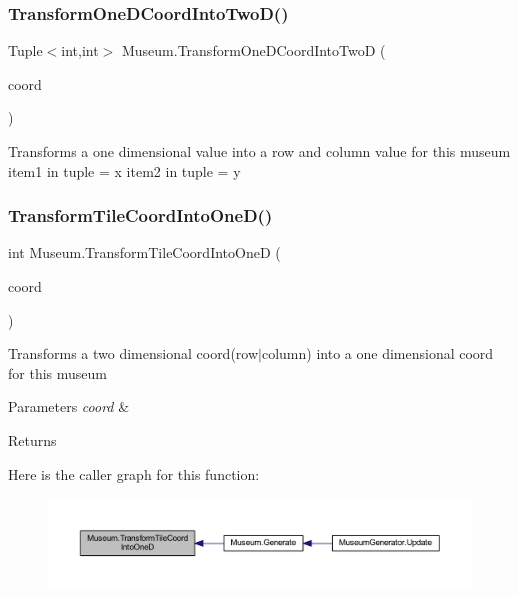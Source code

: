 \subsubsection{\texorpdfstring{Transform\+One\+D\+Coord\+Into\+Two\+D()}{TransformOneDCoordIntoTwoD()}}
{\footnotesize\ttfamily Tuple$<$int,int$>$ Museum.\+Transform\+One\+D\+Coord\+Into\+TwoD (\begin{DoxyParamCaption}\item[{int}]{coord }\end{DoxyParamCaption})\hspace{0.3cm}{\ttfamily [private]}}



Transforms a one dimensional value into a row and column value for this museum item1 in tuple = x item2 in tuple = y 

\mbox{\label{class_museum_a405e60db962417dde46d46180cbf81df}} 
\subsubsection{\texorpdfstring{Transform\+Tile\+Coord\+Into\+One\+D()}{TransformTileCoordIntoOneD()}}
{\footnotesize\ttfamily int Museum.\+Transform\+Tile\+Coord\+Into\+OneD (\begin{DoxyParamCaption}\item[{Vector2\+Int}]{coord }\end{DoxyParamCaption})\hspace{0.3cm}{\ttfamily [private]}}



Transforms a two dimensional coord(row$\vert$column) into a one dimensional coord for this museum 


\begin{DoxyParams}{Parameters}
{\em coord} & \\
\hline
\end{DoxyParams}
\begin{DoxyReturn}{Returns}

\end{DoxyReturn}
Here is the caller graph for this function\+:
\nopagebreak
\begin{figure}[H]
\begin{center}
\leavevmode
\includegraphics[width=350pt]{class_museum_a405e60db962417dde46d46180cbf81df_icgraph}
\end{center}
\end{figure}


